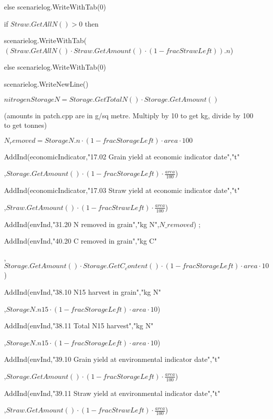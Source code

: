 \documentclass[%
]{scrartcl}
\begin{document}
{{{  else               	 	
scenarielog.WriteWithTab(0)
       
         if $Straw.GetAllN() > 0$ then
               	 	
 scenarielog.WriteWithTab($(Straw.GetAllN() \cdot Straw.GetAmount() \cdot (1-fracStrawLeft)).n$)
                
else               	 	
scenarielog.WriteWithTab(0)
      
   scenarielog.WriteNewLine()
      
   $nitrogen StorageN = Storage.GetTotalN() \cdot Storage.GetAmount()$

       (amounts in patch.cpp are in g/sq metre. Multiply by 10 to get kg, divide by 100 to get tonnes)

          $ N_removed=StorageN.n \cdot (1-fracStorageLeft) \cdot area \cdot 100$
      
   AddInd(economicIndicator,"17.02 Grain yield at economic indicator date","t"

,$Storage.GetAmount() \cdot (1-fracStorageLeft) \cdot \frac{area}{100} $)
       
  AddInd(economicIndicator,"17.03 Straw yield at economic indicator date","t"

,$Straw.GetAmount() \cdot (1-fracStrawLeft) \cdot \frac{area}{100} $)
       
  AddInd(envInd,"31.20 N removed in grain","kg N",$N\_removed$) ;
        
 AddInd(envInd,"40.20 C removed in grain","kg C"

,$Storage.GetAmount() \cdot Storage.GetC_content() \cdot (1-fracStorageLeft) \cdot area \cdot 10$)
      
   AddInd(envInd,"38.10 N15 harvest in grain","kg N"

,$StorageN.n15 \cdot (1-fracStorageLeft) \cdot area \cdot 10$)
        
 AddInd(envInd,"38.11 Total N15 harvest","kg N"

,$StorageN.n15 \cdot (1-fracStorageLeft) \cdot area \cdot 10$)
			
 AddInd(envInd,"39.10 Grain yield at environmental indicator date","t"

,$Storage.GetAmount() \cdot (1-fracStorageLeft) \cdot \frac{area}{100} $)
			
 AddInd(envInd,"39.11 Straw yield at environmental indicator date","t"

,$Straw.GetAmount() \cdot (1-fracStrawLeft) \cdot \frac{area}{100} $)
			
}}}
\end{document}
